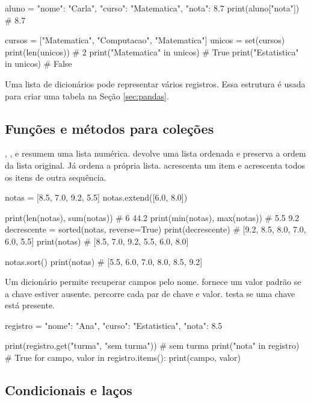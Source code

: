 \begin{exemplo}
aluno = {"nome": "Carla", "curso": "Matematica", "nota": 8.7}
print(aluno["nota"])  # 8.7

cursos = ["Matematica", "Computacao", "Matematica"]
unicos = set(cursos)
print(len(unicos))              # 2
print("Matematica" in unicos)    # True
print("Estatistica" in unicos)   # False
\end{exemplo}

Uma lista de dicionários pode representar vários registros. Essa estrutura é usada para criar uma tabela na Seção \ref{sec:pandas}.

\subsection{Funções e métodos para coleções}

, ,  e  resumem uma lista numérica.  devolve uma lista ordenada e preserva a ordem da lista original. Já  ordena a própria lista.  acrescenta um item e  acrescenta todos os itens de outra sequência.

\begin{exemplo}
notas = [8.5, 7.0, 9.2, 5.5]
notas.extend([6.0, 8.0])

print(len(notas), sum(notas))     # 6 44.2
print(min(notas), max(notas))     # 5.5 9.2
decrescente = sorted(notas, reverse=True)
print(decrescente)  # [9.2, 8.5, 8.0, 7.0, 6.0, 5.5]
print(notas)        # [8.5, 7.0, 9.2, 5.5, 6.0, 8.0]

notas.sort()
print(notas)        # [5.5, 6.0, 7.0, 8.0, 8.5, 9.2]
\end{exemplo}

Um dicionário permite recuperar campos pelo nome.  fornece um valor padrão se a chave estiver ausente.  percorre cada par de chave e valor.  testa se uma chave está presente.

\begin{exemplo}
registro = {"nome": "Ana", "curso": "Estatistica", "nota": 8.5}

print(registro.get("turma", "sem turma"))  # sem turma
print("nota" in registro)                 # True
for campo, valor in registro.items():
    print(campo, valor)
\end{exemplo}

\subsection{Condicionais e laços}

